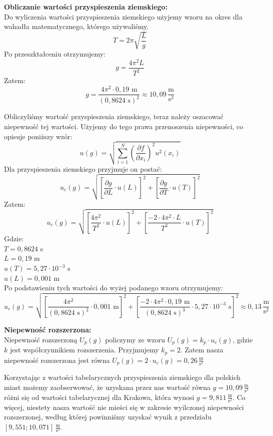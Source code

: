 \documentclass[a4paper,11pt]{article}
\begin{document}
\vspace{2cm}

\noindent \textbf{Obliczanie wartości przyspieszenia ziemskiego:}\\
Do wyliczenia wartości przyspieszenia ziemskiego użyjemy wzoru na okres dla wahadła matematycznego, którego używaliśmy.
$$T = 2\pi\sqrt{\frac{L}{g}} $$
Po przeszktałceniu otrzymujemy:
$$g = \frac{4\pi^2L}{T^2} $$
Zatem:
$$g = \frac{4\pi^2\cdot 0{,}19 \textrm{ m}}{(0{,}8624 \textrm{ s})^2} \approx 10{,}09\,\frac{\textrm{m}}{\textrm{s}^2}$$

Obliczyliśmy wartość przyspieszenia ziemskiego, teraz należy oszacować niepewność tej wartości. Użyjemy do tego prawa przenoszenia niepewności, co opisuje poniższy wzór:
$$u(g) = \sqrt{\displaystyle \sum_{i=1} ^N \left( \frac{\partial f}{\partial x_i}\right)^2 u^2(x_i)}$$
Dla przyspieszenia ziemskiego przyjmuje on postać:
$$u_c(g) = \sqrt{\left[ \frac{\partial g}{\partial L} \cdot u(L) \right]^2 +\left[ \frac{\partial g}{\partial T} \cdot u(T) \right]^2} $$
Zatem:
$$u_c(g) = \sqrt{\left[ \frac{4\pi^2}{T^2} \cdot u(L) \right]^2 +\left[ \frac{-2\cdot 4\pi^2\cdot L}{T^3} \cdot u(T) \right]^2} $$
\noindent Gdzie: \\
$T = 0{,}8624 $ s\\
$L = 0{,}19 $ m\\
$u(T) = 5{,}27\cdot 10^{-3}\textrm{ s} $ \\
$u(L) = 0{,}001$ m \\
Po podstawieniu tych wartości do wyżej podanego wzoru otrzymujemy:
$$u_c(g) = \sqrt{\left[ \frac{4\pi^2}{(0{,}8624 \textrm{ s})^2} \cdot 0{,}001 \textrm{ m} \right]^2 +\left[ \frac{-2\cdot 4\pi^2\cdot 0{,}19 \textrm{ m}}{(0{,}8624 \textrm{ s})^3} \cdot  5{,}27\cdot 10^{-3}\textrm{ s} \right]^2} \approx 0{,}13\,\frac{\textrm{m}}{\textrm{s}^2}$$

\noindent \textbf{Niepewność rozszerzona:} \\
Niepewność rozszerzoną $U_p(g)$ policzymy ze wzoru $U_p(g) = k_p\cdot u_c(g)$, gdzie $k$ jest współczynnikiem rozszerzenia. Przyjmujemy $k_p = 2$. Zatem nasza niepewność rozszerzona jest równa $U_p(g) = 2\cdot u_c(g) = 0{,}26\,\frac{\textrm{m}}{\textrm{s}^2}$

Korzystając z wartości tabelarycznych przyspieszenia ziemskiego dla polskich miast możemy zaobserwować, że uzyskana przez nas wartość równa $g=10{,}09\,\frac{\textrm{m}}{\textrm{s}^2}$ różni się od wartości tabelarycznej dla Krakowa, która wynosi $g=9{,}811\,\frac{\textrm{m}}{\textrm{s}^2}$. Co więcej, niestety nasza wartość nie mieści się w zakresie wyilczonej niepewności rozszerzonej, według której powinniśmy uzyskać wynik z przedziału $\left[9{,}551;10{,}071\right]\, \frac{\textrm{m}}{\textrm{s}^2}$.
\newpage
\end{document}
